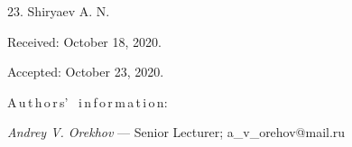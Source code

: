 { 23. {Shiryaev A. N.}\;


\vskip 1.5mm

%


Received:  October 18, 2020.

Accepted: October 23, 2020.

\vskip 4.5mm%
A\,u\,t\,h\,o\,r\,s' \ i\,n\,f\,o\,r\,m\,a\,t\,i\,o\,n:

\vskip 2mm \textit{Andrey V. Orekhov} --- Senior Lecturer;
a\_v\_orehov@mail.ru\par
%
%
}
